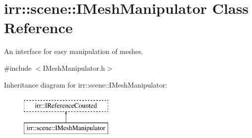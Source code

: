 \hypertarget{classirr_1_1scene_1_1IMeshManipulator}{}\section{irr\+:\+:scene\+:\+:I\+Mesh\+Manipulator Class Reference}
\label{classirr_1_1scene_1_1IMeshManipulator}


An interface for easy manipulation of meshes.  




{\ttfamily \#include $<$I\+Mesh\+Manipulator.\+h$>$}

Inheritance diagram for irr\+:\+:scene\+:\+:I\+Mesh\+Manipulator\+:\begin{figure}[H]
\begin{center}
\leavevmode
\includegraphics[height=2.000000cm]{classirr_1_1scene_1_1IMeshManipulator}
\end{center}
\end{figure}
